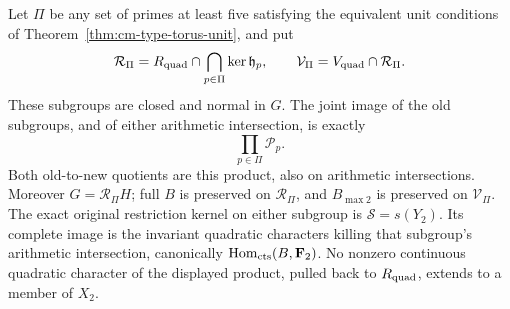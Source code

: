 \begin{theorem}\label{thm:simultaneous-cyclotomic-cm}
Let \(\Pi\) be any set of primes at least five satisfying the equivalent
unit conditions of Theorem~\ref{thm:cm-type-torus-unit}, and put
\[
 \mathcal R_\Pi=R_{\rm quad}\cap\bigcap_{p\in\Pi}\ker\mathfrak h_p,
 \qquad \mathcal V_\Pi=V_{\rm quad}\cap\mathcal R_\Pi.
\]
These subgroups are closed and normal in \(G\). The joint image of the
old subgroups, and of either arithmetic intersection, is exactly
\begin{equation}\label{eq:pdl-simultaneous}
       \prod_{p\in\Pi}\mathcal P_p.
\end{equation}
Both old-to-new quotients are this product, also on arithmetic
intersections. Moreover \(G=\mathcal R_\Pi H\); full \(B\) is preserved
on \(\mathcal R_\Pi\), and \(B_{\max2}\) is preserved on
\(\mathcal V_\Pi\). The exact original restriction kernel on either
subgroup is \(\mathcal S=s(Y_2)\). Its complete image is the invariant
quadratic characters killing that subgroup's arithmetic intersection,
canonically \(\operatorname{Hom}_{\rm cts}(B,\mathbf F_2)\).
No nonzero continuous quadratic character of the displayed product,
pulled back to \(R_{\rm quad}\), extends to a member of \(X_2\).
\end{theorem}

